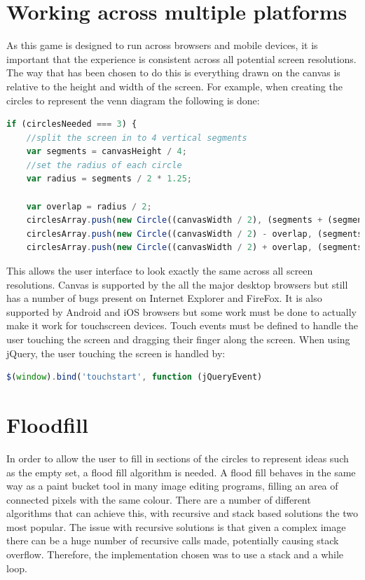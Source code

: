 \documentclass[12pt,a4paper]{report}
\begin{document}
\section{Working across multiple platforms}
As this game is designed to run across browsers and mobile devices, it is important that the experience is consistent across all potential screen resolutions. The way that has been chosen to do this is everything drawn on the canvas is relative to the height and width of the screen. 
For example, when creating the circles to represent the venn diagram the following is done:

\begin{lstlisting}[language=JavaScript]
if (circlesNeeded === 3) {
    //split the screen in to 4 vertical segments
    var segments = canvasHeight / 4;
    //set the radius of each circle
    var radius = segments / 2 * 1.25;

    var overlap = radius / 2;
    circlesArray.push(new Circle((canvasWidth / 2), (segments + (segments * 2)) / 2 + (segments / 6), radius));
    circlesArray.push(new Circle((canvasWidth / 2) - overlap, (segments * 2 + (segments * 3)) / 2 - (segments / 6), radius));
    circlesArray.push(new Circle((canvasWidth / 2) + overlap, (segments * 2 + (segments * 3)) / 2 - (segments / 6), radius));

\end{lstlisting}

This allows the user interface to look exactly the same across all screen resolutions. 
Canvas is supported by the all the major desktop browsers but still has a number of bugs present on Internet Explorer and FireFox. It is also supported by Android and iOS browsers but some work must be done to actually make it work for touchscreen devices. Touch events must be defined to handle the user touching the screen and dragging their finger along the screen. When using jQuery, the user touching the screen is handled by:


\begin{lstlisting}[language=JavaScript]
$(window).bind('touchstart', function (jQueryEvent)

\end{lstlisting}

\section{Floodfill}
In order to allow the user to fill in sections of the circles to represent ideas such as the empty set, a flood fill algorithm is needed. A flood fill behaves in the same way as a paint bucket tool in many image editing programs, filling an area of connected pixels with the same colour. There are a number of different algorithms that can achieve this, with recursive and stack based solutions the two most popular. The issue with recursive solutions is that given a complex image there can be a huge number of recursive calls made, potentially causing stack overflow. 
Therefore, the implementation chosen was to use a stack and a while loop.
\end{document}
